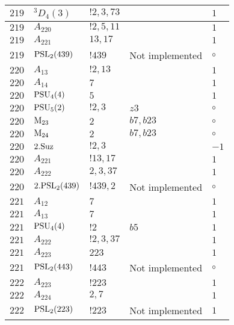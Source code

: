\documentclass[a4paper, 11pt]{article}
\begin{document}
\begin{longtable}{lllll}
        $ 219 $ & $ {}^{3}D_{4}(3) $ & $ ! 2,3,73 $ & $ ~ $ & $ 1$ \\ \hline
        $ 219 $ & $ A_{220} $ & $ !2, 5, 11 $ & $ ~ $ & $ 1$ \\ \hline
        $ 219 $ & $ A_{221} $ & $ 13, 17 $ & $ ~ $ & $ 1$ \\ \hline
        $ 219 $ & $ {\rm PSL}_{2}(439) $ & $ !439 $ &  Not implemented &  $\circ$ \\ \hline
        $ 220 $ & $ A_{13} $ & $ ! 2,13 $ & $ ~ $ & $ 1$ \\ \hline
        $ 220 $ & $ A_{14} $ & $ 7 $ & $ ~ $ & $ 1$ \\ \hline
        $ 220 $ & $ {\rm PSU}_{4}(4) $ & $ 5 $ & $ ~ $ & $ 1$ \\ \hline
        $ 220 $ & $ {\rm PSU}_{5}(2) $ & $ ! 2,3 $ & $ z3 $ &  $\circ$ \\ \hline
        $ 220 $ & $ {\rm M}_{23} $ & $ 2 $ & $ b7, b23 $ &  $\circ$ \\ \hline
        $ 220 $ & $ {\rm M}_{24} $ & $ 2 $ & $ b7, b23 $ &  $\circ$ \\ \hline
        $ 220 $ & $ 2.{\rm Suz} $ & $ ! 2,3 $ & $ ~ $ & $ -1$ \\ \hline
        $ 220 $ & $ A_{221} $ & $ !13, 17 $ & $ ~ $ & $ 1$ \\ \hline
        $ 220 $ & $ A_{222} $ & $ 2, 3, 37 $ & $ ~ $ & $ 1$ \\ \hline
        $ 220 $ & $ 2.{\rm PSL}_{2}(439) $ & $ !439, 2 $ &  Not implemented &  $\circ$ \\ \hline
        $ 221 $ & $ A_{12} $ & $ 7 $ & $ ~ $ & $ 1$ \\ \hline
        $ 221 $ & $ A_{13} $ & $ 7 $ & $ ~ $ & $ 1$ \\ \hline
        $ 221 $ & $ {\rm PSU}_{4}(4) $ & $ ! 2 $ & $ b5 $ & $ 1$ \\ \hline
        $ 221 $ & $ A_{222} $ & $ !2, 3, 37 $ & $ ~ $ & $ 1$ \\ \hline
        $ 221 $ & $ A_{223} $ & $ 223 $ & $ ~ $ & $ 1$ \\ \hline
        $ 221 $ & $ {\rm PSL}_{2}(443) $ & $ !443 $ &  Not implemented &  $\circ$ \\ \hline
        $ 222 $ & $ A_{223} $ & $ !223 $ & $ ~ $ & $ 1$ \\ \hline
        $ 222 $ & $ A_{224} $ & $ 2, 7 $ & $ ~ $ & $ 1$ \\ \hline
        $ 222 $ & $ {\rm PSL}_{2}(223) $ & $ !223 $ &  Not implemented & $ 1$ \\ \hline

\end{longtable}
\end{document}
